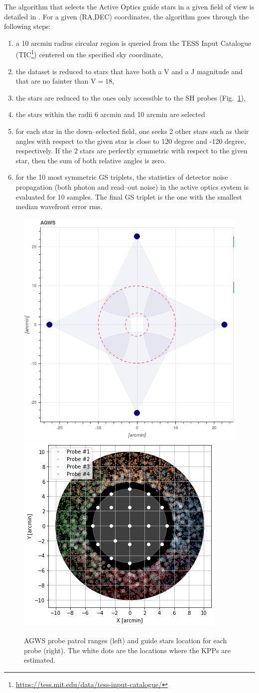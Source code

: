 \documentclass{gmto}
\begin{document}
The algorithm that selects the Active Optics guide stars in a given field of
view is detailed in \cite{ATP}. For a given (RA,DEC) coordinates, the algorithm
goes through the following steps:
\begin{enumerate}
\item a 10 arcmin radius circular region is queried from the TESS Input
  Catalogue
  (TIC\footnote{\url{https://tess.mit.edu/data/tess-input-catalogue/}}) centered
  on the specified sky coordinate,
\item the dataset is reduced to stars that have both a V and a J magnitude and
  that are no fainter than V$=18$,
\item the stars are reduced to the ones only accessible to the SH probes (Fig.~\ref{fig:4}),
\item the stars within the radii 6 arcmin and 10 arcmin are
  selected
\item for each star in the down--selected field, one seeks 2 other stars such as
  their angles with respect to the given star is close to 120 degree and -120
  degree, respectively.
If the 2 stars are perfectly symmetric with respect to the given star, then the
sum of both relative angles is zero.
\item for the 10 most symmetric GS triplets, the statistics of
  detector noise propagation (both photon and read--out noise) in the active optics system is evaluated for 10
  samples.
  The final GS triplet is the one with the smallest median wavefront error rms.
\end{enumerate}
\begin{figure}
  \centering
  \includegraphics[width=0.45\linewidth]{AGWS_probe_range_layout.png}
  \includegraphics[width=0.5\linewidth]{active_optics_guide_stars.png}
  \caption{AGWS probe patrol ranges (left) and guide stars location for each
    probe (right). The white dots are the locations where the KPPs are estimated.}
  \label{fig:4}
\end{figure}
\end{document}
